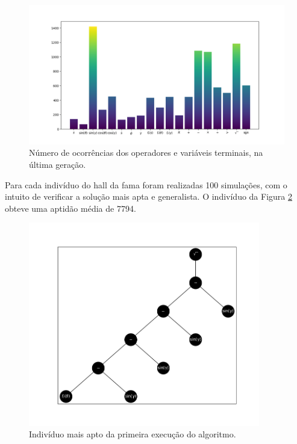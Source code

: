 \begin{figure}[H]
	\centering
	\includegraphics[width=\textwidth]{02_desenvolvimento/04_EC_Fig_DPOperHist.png}
	\caption{Número de ocorrências dos operadores e variáveis terminais, na última geração.}
	\label{fig:4ec-dpoperhist}
\end{figure}

Para cada indivíduo do hall da fama foram realizadas 100 simulações, com o intuito de verificar a solução mais apta e generalista. O indivíduo da Figura \ref{fig:4ec-dpindiv1} obteve uma aptidão média de 7794.

\begin{figure}[H]
	\centering
	\includegraphics[width=0.9\textwidth]{02_desenvolvimento/04_EC_Fig_DPIndiv1}
	\caption{Indivíduo mais apto da primeira execução do algoritmo.}
	\label{fig:4ec-dpindiv1}
\end{figure}

